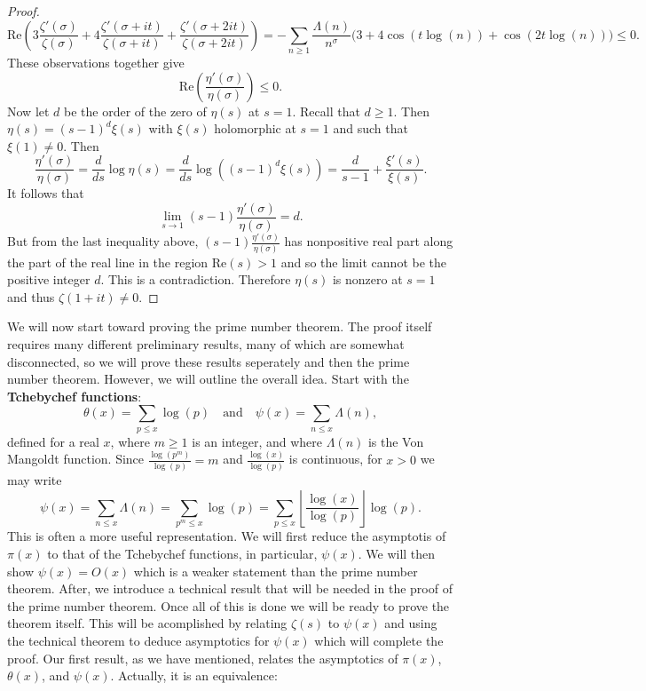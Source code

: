\documentclass[12pt]{book}
\theoremstyle{definition}\newframedtheorem{method}{Method}
\newcommand{\z}{\zeta}
\renewcommand{\t}{\theta}
\newcommand{\s}{\sigma}
\renewcommand{\L}{\Lambda}
\newcommand{\<}{\langle}
\renewcommand{\>}{\rangle}
\renewcommand{\Re}{\mathrm{Re}}
\begin{document}
\begin{proof}
        \[
          \Re\left(3\frac{\z'(\s)}{\z(\s)}+4\frac{\z'(\s+it)}{\z(\s+it)}+\frac{\z'(\s+2it)}{\z(\s+2it)}\right) = -\sum_{n \ge 1}\frac{\L(n)}{n^{\s}}\bigg(3+4\cos(t\log(n))+\cos(2t\log(n))\bigg) \le 0.
        \]
        These observations together give
        \[
          \Re\left(\frac{\eta'(\s)}{\eta(\s)}\right) \le 0.
        \]
        Now let $d$ be the order of the zero of $\eta(s)$ at $s = 1$. Recall that $d \ge 1$. Then $\eta(s) = (s-1)^{d}\xi(s)$ with $\xi(s)$ holomorphic at $s = 1$ and such that $\xi(1) \neq 0$. Then
        \[
          \frac{\eta'(\s)}{\eta(\s)} = \frac{d}{ds}\log\eta(s) = \frac{d}{ds}\log((s-1)^{d}\xi(s)) = \frac{d}{s-1}+\frac{\xi'(s)}{\xi(s)}.
        \]
        It follows that
        \[
          \lim_{s \to 1}(s-1)\frac{\eta'(\s)}{\eta(\s)} = d.
        \]
        But from the last inequality above, $(s-1)\frac{\eta'(\s)}{\eta(\s)}$ has nonpositive real part along the part of the real line in the region $\Re(s) > 1$ and so the limit cannot be the positive integer $d$. This is a contradiction. Therefore $\eta(s)$ is nonzero at $s = 1$ and thus $\z(1+it) \neq 0$.
      \end{proof}

      We will now start toward proving the prime number theorem. The proof itself requires many different preliminary results, many of which are somewhat disconnected, so we will prove these results seperately and then the prime number theorem. However, we will outline the overall idea. Start with the \textbf{Tchebychef functions}:
      \[
        \t(x) = \sum_{p \le x}\log(p) \quad \text{and} \quad \psi(x) = \sum_{n \le x}\L(n),
      \]
      defined for a real $x$, where $m \ge 1$ is an integer, and where $\L(n)$ is the Von Mangoldt function. Since $\frac{\log(p^{m})}{\log(p)} = m$ and $\frac{\log(x)}{\log(p)}$ is continuous, for $x > 0$ we may write
      \[
        \psi(x) = \sum_{n \le x}\L(n) = \sum_{p^{m} \le x}\log(p) = \sum_{p \le x}\left\lfloor\frac{\log(x)}{\log(p)}\right\rfloor\log(p).
      \]
      This is often a more useful representation. We will first reduce the asymptotis of $\pi(x)$ to that of the Tchebychef functions, in particular, $\psi(x)$. We will then show $\psi(x) = O(x)$ which is a weaker statement than the prime number theorem. After, we introduce a technical result that will be needed in the proof of the prime number theorem. Once all of this is done we will be ready to prove the theorem itself. This will be acomplished by relating $\z(s)$ to $\psi(x)$ and using the technical theorem to deduce asymptotics for $\psi(x)$ which will complete the proof. Our first result, as we have mentioned, relates the asymptotics of $\pi(x)$, $\t(x)$, and $\psi(x)$. Actually, it is an equivalence:
\end{document}
